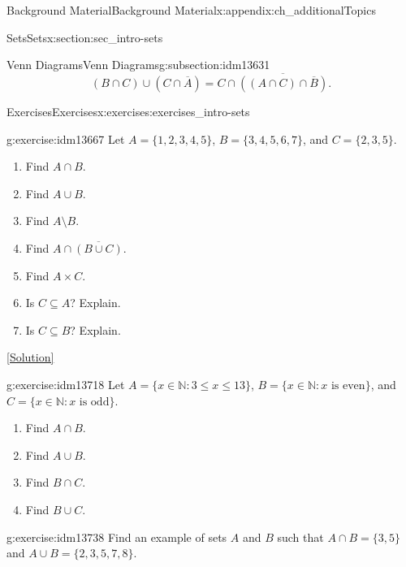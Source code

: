\documentclass[oneside,10pt,]{book}
\numberwithin{equation}{chapter}
\def\N{\mathbb N}
\def\st{:}
\begin{document}
\begin{appendixptx}{Background Material}{}{Background Material}{}{}{x:appendix:ch_additionalTopics}
\begin{sectionptx}{Sets}{}{Sets}{}{}{x:section:sec_intro-sets}
\begin{subsectionptx}{Venn Diagrams}{}{Venn Diagrams}{}{}{g:subsection:idm13631}
\begin{equation*}
(B \cap C) \cup (C \cap \overline A) = C \cap \overline{\left((A\cap C)\cap \overline B\right)}.
\end{equation*}
%
\end{subsectionptx}
%
%
\typeout{************************************************}
\typeout{************************************************}
%
\begin{exercises-subsection}{Exercises}{}{Exercises}{}{}{x:exercises:exercises_intro-sets}
\begin{divisionexercise}{1}{}{}{g:exercise:idm13667}%
Let \(A = \{1,2,3,4,5\}\), \(B = \{3,4,5,6,7\}\), and \(C = \{2,3,5\}\).%
\par
%
\begin{enumerate}[label=(\alph*)]
\item{}Find \(A \cap B\).%
\item{}Find \(A \cup B\).%
\item{}Find \(A \setminus B\).%
\item{}Find \(A \cap \overline{(B \cup C)}\).%
\item{}Find \(A \times C\).%
\item{}Is \(C \subseteq A\)? Explain.%
\item{}Is \(C \subseteq B\)? Explain.%
\end{enumerate}
%
\space\hspace*{0pt}\hfill{\tiny\hyperlink{g:solution:idm13696-main}{[Solution]}}\end{divisionexercise}%
\begin{divisionexercise}{2}{}{}{g:exercise:idm13718}%
Let \(A = \{x \in \N \st 3 \le x \le 13\}\), \(B = \{x \in \N \st x \mbox{ is even} \}\), and \(C = \{x \in \N \st x \mbox{ is odd} \}\).%
\par
%
\begin{enumerate}[label=(\alph*)]
\item{}Find \(A \cap B\).%
\item{}Find \(A \cup B\).%
\item{}Find \(B \cap C\).%
\item{}Find \(B \cup C\).%
\end{enumerate}
%
\end{divisionexercise}%
\begin{divisionexercise}{3}{}{}{g:exercise:idm13738}%
Find an example of sets \(A\) and \(B\) such that \(A\cap B = \{3, 5\}\) and \(A \cup B = \{2, 3, 5, 7, 8\}\).%
\end{divisionexercise}%

\end{exercises-subsection}
\end{sectionptx}
\end{appendixptx}
\end{document}
